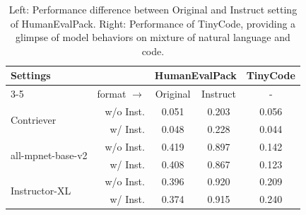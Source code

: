 
\begin{table}[!htp]\centering
\scriptsize
\begin{tabular}{lrcc|c}\toprule
\multirow{2}{*}{Settings}& &\multicolumn{2}{c}{HumanEvalPack}&TinyCode\\
\cmidrule{3-5}
& format $\rightarrow$ &Original &Instruct & -  \\\midrule
\multirow{2}{*}{Contriever} &w/o Inst. &0.051 &0.203 &0.056 \\
&w/ Inst. &0.048 &0.228 &0.044 \\
\multirow{2}{*}{all-mpnet-base-v2} &w/o Inst. &0.419 &0.897 &0.142 \\
&w/ Inst. &0.408 &0.867 &0.123 \\
\multirow{2}{*}{Instructor-XL} &w/o Inst. &0.396 &0.920 &0.209 \\
&w/ Inst. &0.374 &0.915 &0.240 \\
\bottomrule
\end{tabular}
\caption{Left: Performance difference between Original and Instruct setting of HumanEvalPack. Right: Performance of TinyCode, providing a glimpse of model behaviors on mixture of natural language and code.}\label{tab: code-ablation2}
\end{table}